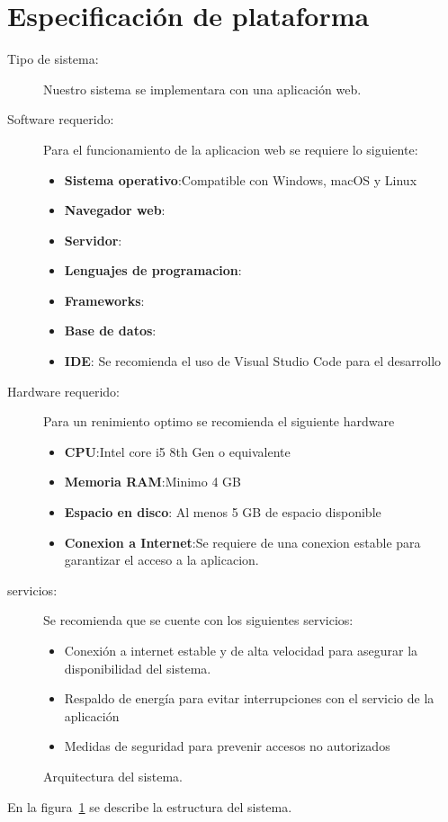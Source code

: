     
\section{Especificación de plataforma}	
	
\begin{description}
	\item[Tipo de sistema:] Nuestro sistema se implementara con una aplicación web.
	\item[Software requerido:] Para el funcionamiento de la aplicacion web se requiere lo siguiente:
        \begin{itemize}
            \item {\bf Sistema operativo}:Compatible con Windows, macOS y Linux
            \item {\bf Navegador web}:
            \item {\bf Servidor}:
            \item {\bf Lenguajes de programacion}:
            \item {\bf Frameworks}:
            \item {\bf Base de datos}:
            \item {\bf IDE}: Se recomienda el uso de Visual Studio Code para el desarrollo
        \end{itemize}
	\item[Hardware requerido:] Para un renimiento optimo se recomienda el siguiente hardware
        \begin{itemize}
            \item {\bf CPU}:Intel core i5 8th Gen o equivalente
            \item {\bf Memoria RAM}:Minimo 4 GB
            \item {\bf Espacio en disco}: Al menos 5 GB de espacio disponible
            \item {\bf Conexion a Internet}:Se requiere de una conexion estable para garantizar el acceso a la aplicacion.
        \end{itemize}
	\item[servicios:] Se recomienda que se cuente con los siguientes servicios:
        \begin{itemize}
            \item Conexión a internet estable y de alta velocidad para asegurar la disponibilidad del sistema.
            \item Respaldo de energía para evitar interrupciones con el servicio de la aplicación
            \item Medidas de seguridad para prevenir accesos no autorizados
        \end{itemize}
\end{description}


\begin{figure}[htbp!]
	\begin{center}
		\caption{Arquitectura del sistema.}
		\label{fig:arquitectura}
	\end{center}
\end{figure}

En la figura~\ref{fig:arquitectura} se describe la estructura del sistema.
